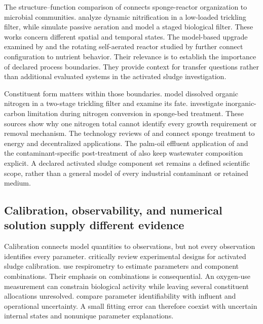 The structure--function comparison of \citet{Hatamoto2018} connects sponge-reactor organization to microbial communities. \citet{Seggelke1999} analyze dynamic nitrification in a low-loaded trickling filter, while \citet{Hellal2021} simulate passive aeration and \citet{Liang2021} model a staged biological filter. These works concern different spatial and temporal states. The model-based upgrade examined by \citet{DiezMontero2019} and the rotating self-aerated reactor studied by \citet{Luan2023} further connect configuration to nutrient behavior. Their relevance is to establish the importance of declared process boundaries. They provide context for transfer questions rather than additional evaluated systems in the activated sludge investigation.

Constituent form matters within those boundaries. \citet{Kasi2011} model dissolved organic nitrogen in a two-stage trickling filter and \citet{Simsek2012} examine its fate. \citet{BressaniRibeiro2021} investigate inorganic-carbon limitation during nitrogen conversion in sponge-bed treatment. These sources show why one nitrogen total cannot identify every growth requirement or removal mechanism. The technology reviews of \citet{Tyagi2021} and \citet{Nasr2022} connect sponge treatment to energy and decentralized applications. The palm-oil effluent application of \citet{Rapi2021} and the contaminant-specific post-treatment of \citet{Mahmoud2018} also keep wastewater composition explicit. A declared activated sludge component set remains a defined scientific scope, rather than a general model of every industrial contaminant or retained medium.

\subsection{Calibration, observability, and numerical solution supply different evidence}

Calibration connects model quantities to observations, but not every observation identifies every parameter. \citet{Petersen2003} critically review experimental designs for activated sludge calibration. \citet{Vanrolleghem1999} use respirometry to estimate parameters and component combinations. Their emphasis on combinations is consequential. An oxygen-use measurement can constrain biological activity while leaving several constituent allocations unresolved. \citet{Machado2014} compare parameter identifiability with influent and operational uncertainty. A small fitting error can therefore coexist with uncertain internal states and nonunique parameter explanations.


